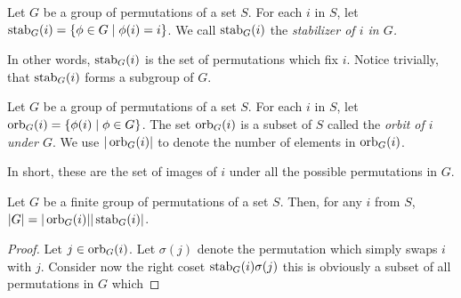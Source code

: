 \begin{definition}
	Let $G$ be a group of permutations of a set $S$. For each $i$ in $S$, let $\operatorname{stab}_{G}(i)=\{\phi\in G\mid \phi(i)=i\}$. We call $\operatorname{stab}_G(i)$ the \textit{stabilizer of $i$ in $G$.} 
\end{definition}
In other words, $\operatorname{stab}_{G}(i)$ is the set of permutations which fix $i$. Notice trivially, that $\operatorname{stab}_G(i)$ forms a subgroup of $G$.

\begin{definition}
	Let $G$ be a group of permutations of a set $S$. For each $i$ in $S$, let $\operatorname{orb}_G(i)=\{\phi(i)\mid\phi\in G\}$. The set $\operatorname{orb}_G(i)$ is a subset of $S$ called the \textit{orbit of $i$ under $G$}. We use $|\operatorname{orb}_G(i)|$ to denote the number of elements in $\operatorname{orb}_G(i)$.
\end{definition}
In short, these are the set of images of $i$ under all the possible permutations in $G$.

\begin{theorem}
	Let $G$ be a finite group of permutations of a set $S$. Then, for any $i$ from $S$, $|G|=|\operatorname{orb}_G(i)||\operatorname{stab}_G(i)|$.
\end{theorem}
\begin{proof}
	Let $j\in\operatorname{orb}_G(i)$. Let $\sigma(j)$ denote the permutation which simply swaps $i$ with $j$. Consider now the right coset $\operatorname{stab}_{G}(i)\sigma(j)$ this is obviously a subset of all permutations in $G$ which 
\end{proof}